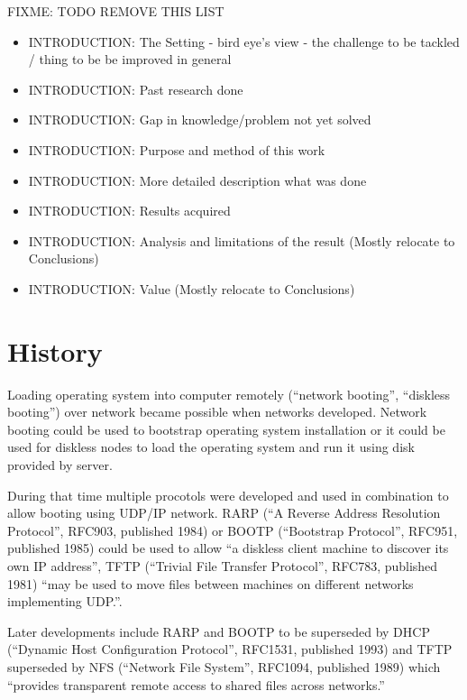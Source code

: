 
FIXME: TODO REMOVE THIS LIST
\begin{itemize}
\item INTRODUCTION: The Setting - bird eye's view - the challenge to be tackled / thing to be be improved in general
\item INTRODUCTION: Past research done
\item INTRODUCTION: Gap in knowledge/problem not yet solved
\item INTRODUCTION: Purpose and method of this work
\item INTRODUCTION: More detailed description what was done
\item INTRODUCTION: Results acquired
\item INTRODUCTION: Analysis and limitations of the result (Mostly relocate to Conclusions)
\item INTRODUCTION: Value (Mostly relocate to Conclusions)
\end{itemize}


\section{History}

Loading operating system into computer remotely (``network booting'',
``diskless booting'') over network became possible when networks
developed. Network booting could be used to bootstrap operating system
installation or it could be used for diskless nodes to load the
operating system and run it using disk provided by server.

During that time multiple procotols were developed and used in
combination to allow booting using UDP/IP network. RARP (``A Reverse
Address Resolution Protocol'', RFC903, published 1984\cite{RFC903}) or
BOOTP (``Bootstrap Protocol'', RFC951, published 1985\cite{RFC951})
could be used to allow ``a diskless client machine to discover its own
IP address''\cite{RFC951}, TFTP (``Trivial File Transfer Protocol'',
RFC783, published 1981\cite{RFC783}) ``may be used to move files
between machines on different networks implementing
UDP.''\cite{RFC783}.

Later developments include RARP and BOOTP to be superseded by DHCP
(``Dynamic Host Configuration Protocol'', RFC1531, published
1993\cite{RFC1531}) and TFTP superseded by NFS (``Network File
System'', RFC1094, published 1989\cite{RFC1094}) which ``provides
transparent remote access to shared files across
networks.''\cite{RFC1094}


